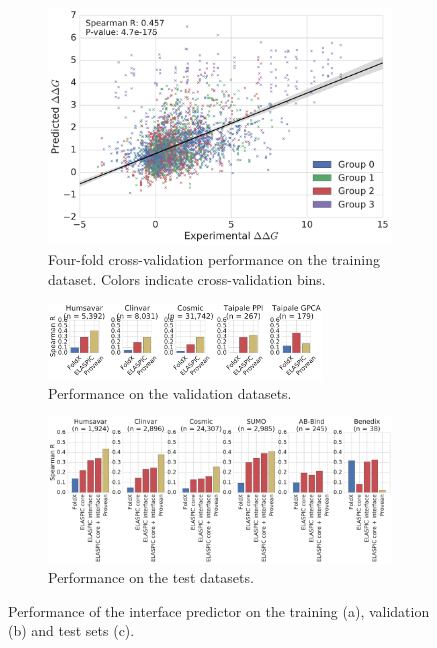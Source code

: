 \begin{figure}[ht]

	\begin{subfigure}[b]{1.0\textwidth}
		\centering
		\includegraphics[width=0.6\linewidth]{static/elaspic_training_set/validation/crossvalidation_performance_interface.pdf}
		\caption{Four-fold cross-validation performance on the training dataset. Colors indicate cross-validation bins.}
		\vspace*{10mm}
	\end{subfigure}

	\begin{subfigure}[b]{1.0\textwidth}
		\centering
		\includegraphics[width=0.8\textwidth]{static/elaspic_training_set/validation/validation_performance_interface.pdf}
		\caption{Performance on the validation datasets.}
		\vspace*{10mm}
	\end{subfigure}

	\begin{subfigure}[b]{1.0\textwidth}
		\centering
		\includegraphics[width=1.0\textwidth]{static/elaspic_training_set/validation/test_performance_interface.pdf}
		\caption{Performance on the test datasets.}
	\end{subfigure}

	\caption{Performance of the interface predictor on the training (a), validation (b) and test sets (c).}
\end{figure}


